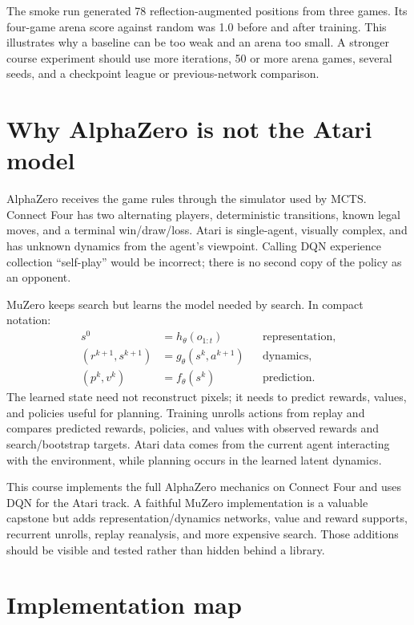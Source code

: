 \documentclass[11pt]{article}
\begin{document}
The smoke run generated 78 reflection-augmented positions from three games.
Its four-game arena score against random was 1.0 before and after training. This
illustrates why a baseline can be too weak and an arena too small. A stronger
course experiment should use more iterations, 50 or more arena games, several
seeds, and a checkpoint league or previous-network comparison.

\section{Why AlphaZero is not the Atari model}

AlphaZero receives the game rules through the simulator used by MCTS. Connect
Four has two alternating players, deterministic transitions, known legal moves,
and a terminal win/draw/loss. Atari is single-agent, visually complex, and has
unknown dynamics from the agent's viewpoint. Calling DQN experience collection
``self-play'' would be incorrect; there is no second copy of the policy as an
opponent.

MuZero keeps search but learns the model needed by search. In compact notation:
\begin{align}
s^0&=h_\theta(o_{1:t}) && \text{representation},\\
(r^{k+1},s^{k+1})&=g_\theta(s^k,a^{k+1}) && \text{dynamics},\\
(p^k,v^k)&=f_\theta(s^k) && \text{prediction}.
\end{align}
The learned state need not reconstruct pixels; it needs to predict rewards,
values, and policies useful for planning. Training unrolls actions from replay
and compares predicted rewards, policies, and values with observed rewards and
search/bootstrap targets. Atari data comes from the current agent interacting
with the environment, while planning occurs in the learned latent dynamics.

This course implements the full AlphaZero mechanics on Connect Four and uses DQN
for the Atari track. A faithful MuZero implementation is a valuable capstone but
adds representation/dynamics networks, value and reward supports, recurrent
unrolls, replay reanalysis, and more expensive search. Those additions should be
visible and tested rather than hidden behind a library.

\section{Implementation map}
\end{document}
